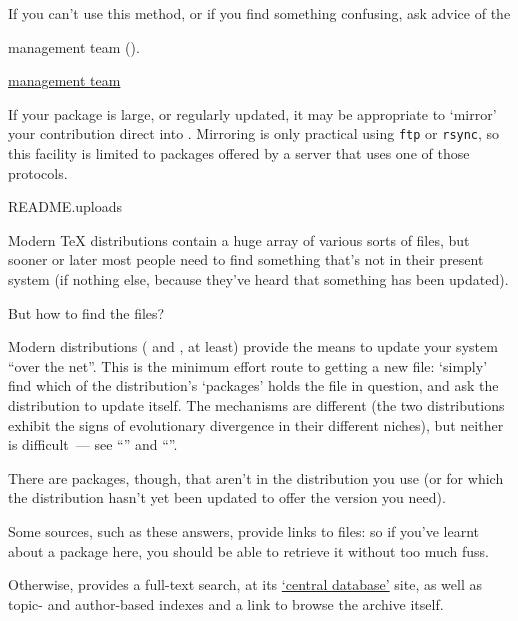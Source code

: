 If you can't use this method, or if you find something confusing, ask
advice of the
\begin{flatversion}
   management team ().
\end{flatversion}
\begin{hyperversion}
  \href{mailto:ctan@dante.de}{ management team}
\end{hyperversion}

If your package is large, or regularly updated, it may be appropriate
to `mirror' your contribution direct into .
Mirroring is only practical using \texttt{ftp} or \texttt{rsync}, so
this facility is limited to packages offered by a server that uses one
of those protocols.
\begin{ctanrefs}
\item[README.uploads]
\end{ctanrefs}


Modern \TeX{} distributions contain a huge array of various sorts of
files, but sooner or later most people need to find something that's
not in their present system (if nothing else, because they've heard
that something has been updated).

But how to find the files?

Modern distributions (\texlive{} and \miktex{}, at least) provide the
means to update your system ``over the net''.  This is the minimum
effort route to getting a new file: `simply' find which of the
distribution's `packages' holds the file in question, and ask the
distribution to update itself.  The mechanisms are different (the two
distributions exhibit the signs of evolutionary divergence in their
different niches), but neither is difficult~--- see %
``'' and %
``''.

There are packages, though, that aren't in the distribution you use
(or for which the distribution hasn't yet been updated to offer the
version you need).

Some sources, such as these  answers, provide links to
files: so if you've learnt about a package here, you should be able to
retrieve it without too much fuss.

Otherwise,  provides a full-text search, at its
\href{http://www.ctan.org/}{`central database'} site, as well as
topic- and author-based indexes and a link to browse the archive
itself.

